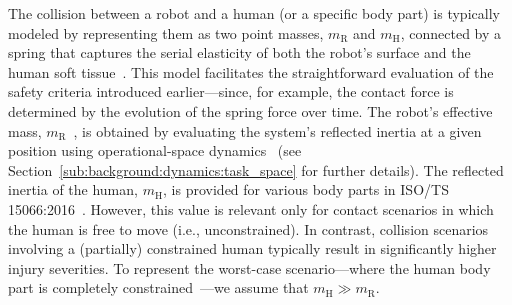 The collision between a robot and a human (or a specific body part) is typically modeled by representing them as two point masses, $m_\mathrm{R}$ and $m_\mathrm{H}$, connected by a spring that captures the serial elasticity of both the robot’s surface and the human soft tissue~\citep{bicchi2004fast, haddadin2009requirements, iso2016collaborative}. This model facilitates the straightforward evaluation of the safety criteria introduced earlier—since, for example, the contact force is determined by the evolution of the spring force over time. The robot’s effective mass, $m_\mathrm{R}$~\citep{kirschner2021notion}, is obtained by evaluating the system’s reflected inertia at a given position using operational-space dynamics~\citep{khatib1987unified} (see Section~\ref{sub:background:dynamics:task_space} for further details). The reflected inertia of the human, $m_\mathrm{H}$, is provided for various body parts in ISO/TS 15066:2016~\citep{iso2016collaborative}. However, this value is relevant only for contact scenarios in which the human is free to move (i.e., unconstrained). In contrast, collision scenarios involving a (partially) constrained human typically result in significantly higher injury severities. To represent the worst-case scenario—where the human body part is completely constrained~\citep{haddadin2009requirements, haddadin2011safe}—we assume that $m_\mathrm{H} \gg m_\mathrm{R}$.


